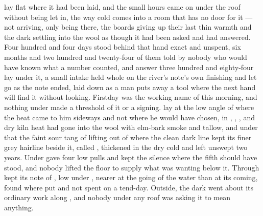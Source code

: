 
 lay flat where it had been laid, and the small hours came on under the roof without being let in, the way cold comes into a room that has no door for it --- not arriving, only being there, the boards giving up their last thin warmth and the dark settling into the wool as though it had been asked and had answered. Four hundred and four days stood behind that hand exact and unspent, six months and two hundred and twenty-four of them told by nobody who would have known what a number counted, and answer three hundred and eighty-four lay under it, a small intake held whole on the river's note's own finishing and let go as the note ended, laid down as a man puts away a tool where the next hand will find it without looking. Firstday was the working name of this morning, and nothing under  made a threshold of it or a signing.  lay at the low angle of  where the heat came to him sideways and not where he would have chosen, in , , , and dry kiln heat had gone into the wool with elm-bark smoke and tallow, and under that the faint sour tang of  lifting out of  where the clean dark line kept its finer grey hairline beside it, called , thickened in the dry cold and left unswept two years. Under   gave four low pulls and kept the silence where the fifth should have stood, and nobody lifted the floor to supply what was wanting below it. Through   kept its note of , low under , nearer at the going of the water than at its coming, found where put and not spent on a tend-day. Outside, the dark went about its ordinary work along , and nobody under any roof was asking it to mean anything.

